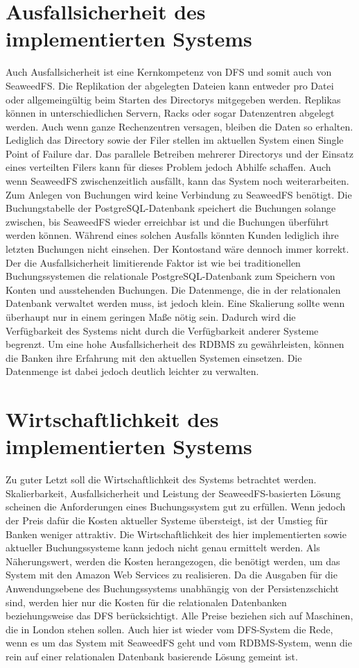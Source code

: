 \documentclass[12pt,oneside,a4paper,parskip]{scrbook}
\begin{document}
\section{Ausfallsicherheit des implementierten Systems}
Auch Ausfallsicherheit ist eine Kernkompetenz von DFS und somit auch von SeaweedFS. Die Replikation der abgelegten Dateien kann entweder pro Datei oder allgemeingültig beim Starten des Directorys mitgegeben werden. Replikas können in unterschiedlichen Servern, Racks oder sogar Datenzentren abgelegt werden. Auch wenn ganze Rechenzentren versagen, bleiben die Daten so erhalten. Lediglich das Directory sowie der Filer stellen im aktuellen System einen Single Point of Failure dar. Das parallele Betreiben mehrerer Directorys und der Einsatz eines verteilten Filers kann für dieses Problem jedoch Abhilfe schaffen. Auch wenn SeaweedFS zwischenzeitlich ausfällt, kann das System noch weiterarbeiten. Zum Anlegen von Buchungen wird keine Verbindung zu SeaweedFS benötigt. Die Buchungstabelle der PostgreSQL-Datenbank speichert die Buchungen solange zwischen, bis SeaweedFS wieder erreichbar ist und die Buchungen überführt werden können. Während eines solchen Ausfalls könnten Kunden lediglich ihre letzten Buchungen nicht einsehen. Der Kontostand wäre dennoch immer korrekt. Der die Ausfallsicherheit limitierende Faktor ist wie bei traditionellen Buchungssystemen die relationale PostgreSQL-Datenbank zum Speichern von Konten und ausstehenden Buchungen. Die Datenmenge, die in der relationalen Datenbank verwaltet werden muss, ist jedoch klein. Eine Skalierung sollte wenn überhaupt nur in einem geringen Maße nötig sein. Dadurch wird die Verfügbarkeit des Systems nicht durch die Verfügbarkeit anderer Systeme begrenzt. Um eine hohe Ausfallsicherheit des RDBMS zu gewährleisten, können die Banken ihre Erfahrung mit den aktuellen Systemen einsetzen. Die Datenmenge ist dabei jedoch deutlich leichter zu verwalten. 


\section{Wirtschaftlichkeit des implementierten Systems}
Zu guter Letzt soll die Wirtschaftlichkeit des Systems betrachtet werden. Skalierbarkeit, Ausfallsicherheit und Leistung der SeaweedFS-basierten Lösung scheinen die Anforderungen eines Buchungssystem gut zu erfüllen. Wenn jedoch der Preis dafür die Kosten aktueller Systeme übersteigt, ist der Umstieg für Banken weniger attraktiv. Die Wirtschaftlichkeit des hier implementierten sowie aktueller Buchungssysteme kann jedoch nicht genau ermittelt werden. Als Näherungswert, werden die Kosten herangezogen, die benötigt werden, um das System mit den Amazon Web Services zu realisieren. Da die Ausgaben für die Anwendungsebene des Buchungssystems unabhängig von der Persistenzschicht sind, werden hier nur die Kosten für die relationalen Datenbanken beziehungsweise das DFS berücksichtigt. Alle Preise beziehen sich auf Maschinen, die in London stehen sollen. Auch hier ist wieder vom DFS-System die Rede, wenn es um das System mit SeaweedFS geht und vom RDBMS-System, wenn die rein auf einer relationalen Datenbank basierende Lösung gemeint ist.
\end{document}
